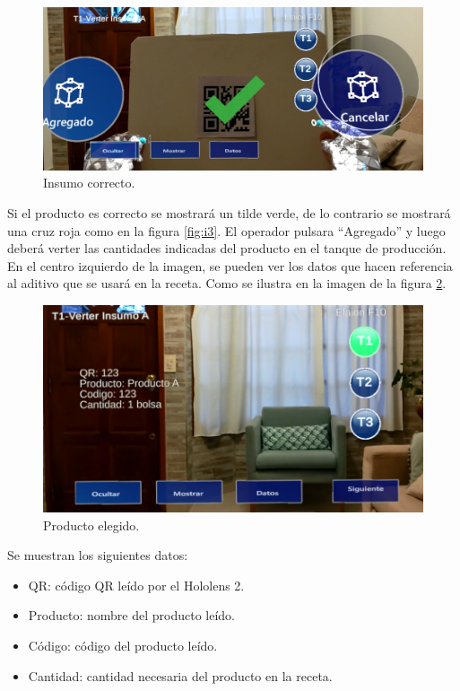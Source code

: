 \begin{figure}[!htpb]
	\centering
	\includegraphics[scale=.4]{./Figures/i8.PNG}
	\caption{Insumo correcto\protect\footnotemark.}
	\label{fig:i8}
\end{figure}

Si el producto es correcto se mostrará un tilde verde, de lo contrario se mostrará una cruz roja como en la figura \ref{fig:i3}. El operador pulsara ``Agregado'' y luego deberá verter las cantidades indicadas del producto en el tanque de producción. En el centro izquierdo de la imagen, se pueden ver los datos que hacen referencia al aditivo que se usará en la receta. Como se ilustra en la imagen de la figura \ref{fig:i9}.

\begin{figure}[!htpb]
	\centering
	\includegraphics[scale=.5]{./Figures/i9.PNG}
	\caption{Producto elegido\protect\footnotemark.}
	\label{fig:i9}
\end{figure}

Se muestran los siguientes datos:

\begin{itemize}
\item QR: código QR leído por el Hololens 2.
\item Producto: nombre del producto leído. 
\item Código: código del producto leído.
\item Cantidad: cantidad necesaria del producto en la receta.
\end{itemize}


